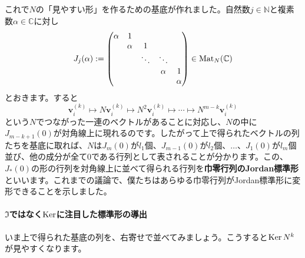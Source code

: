 これで$N$の「見やすい形」を作るための基底が作れました。自然数$j \in \mathbb{N}$と複素数$\alpha \in \mathbb{C}$に対し
\[
J_{j}(\alpha) :=
\begin{pmatrix}
\alpha & 1 \\
& \alpha & 1 \\
& & \ddots & \ddots \\
& & & \alpha & 1 \\
& & & & \alpha
\end{pmatrix}
\in \operatorname{Mat}_N(\mathbb{C})
\]
とおきます。すると
\[
\bm{v}^{(k)}_i \mapsto N \bm{v}^{(k)}_i \mapsto N^2 \bm{v}^{(k)}_i \mapsto \cdots \mapsto N^{m - k} \bm{v}^{(k)}_i
\]
という$N$でつながった一連のベクトルがあることに対応し、$N$の中に$J_{m - k + 1}(0)$が対角線上に現れるのです。したがって上で得られたベクトルの列たちを基底に取れば、$N$は$J_{m}(0)$が$l_1$個、$J_{m - 1}(0)$が$l_2$個、$\ldots$、$J_{1}(0)$が$l_m$個並び、他の成分が全て$0$である行列として表されることが分かります。この、$J_{*}(0)$の形の行列を対角線上に並べて得られる行列を\textbf{巾零行列のJordan標準形}といいます。これまでの議論で、僕たちはあらゆる巾零行列がJordan標準形に変形できることを示しました。

\paragraph{$\Im$ではなく$\operatorname{Ker}$に注目した標準形の導出}

いま上で得られた基底の列を、右寄せで並べてみましょう。こうすると$\operatorname{Ker} N^k$が見やすくなります。

